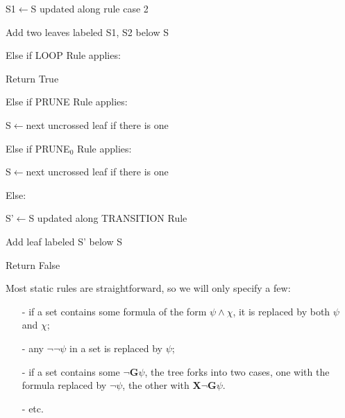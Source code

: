 \documentclass[11pt]{article}
\newcommand{\X}{{\mathbf{X}}}
\newcommand{\andd}{{\wedge}}
\newcommand{\G}{{\mathbf{G}}}
\theoremstyle{definition}
\begin{document}
{\hspace*{1cm}\hspace*{1cm}        S1$\gets$S updated along rule case 2
        
\hspace*{1cm}\hspace*{1cm}        Add two leaves labeled S1, S2 below S

\hspace*{1cm}    Else if LOOP Rule applies:

\hspace*{1cm}\hspace*{1cm}      Return True

\hspace*{1cm}   Else if PRUNE Rule applies:

\hspace*{1cm}\hspace*{1cm}      S$\gets$next uncrossed leaf if there is one

\hspace*{1cm}   Else if {PRUNE}$_0$ Rule applies:

\hspace*{1cm}\hspace*{1cm}       S$\gets$next uncrossed leaf if there is one

\hspace*{1cm}   Else:

\hspace*{1cm}\hspace*{1cm}      S'$\gets$S updated along TRANSITION Rule

\hspace*{1cm}\hspace*{1cm}      Add leaf labeled S' below S

Return False \newline

}

Most static rules are straightforward, so we will only specify a few: 
\begin{itemize}
    \item [-] if a set contains some formula of the form $\psi\andd\chi$, it is replaced by both $\psi$ and $\chi$;
    \item [-] any $\neg\neg\psi$ in a set is replaced by $\psi$;
    \item [-] if a set contains some $\neg\G\psi$, the tree forks into two cases, one with the formula replaced by $\neg\psi$, the
    other with $\X\neg\G\psi$.
    \item [-] etc.
\end{itemize}
\end{document}

